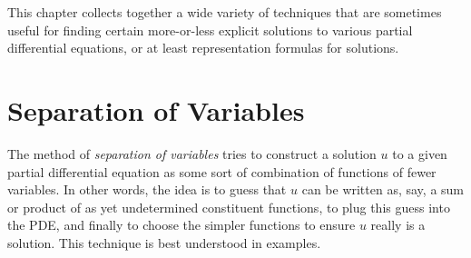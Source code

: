 %


This chapter collects together a wide variety of techniques that are sometimes useful for finding certain more-or-less explicit solutions to various partial differential equations, or at least representation formulas for solutions.

\section{Separation of Variables}
\label{sec:separation-of-variables}

The method of \textit{separation of variables} tries to construct a solution $u$ to a given partial differential equation as some sort of combination of functions of fewer variables. In other words, the idea is to guess that $u$ can be written as, say, a sum or product of as yet undetermined constituent functions, to plug this guess into the PDE, and finally to choose the simpler functions to ensure $u$ really is a solution. This technique is best understood in examples.

